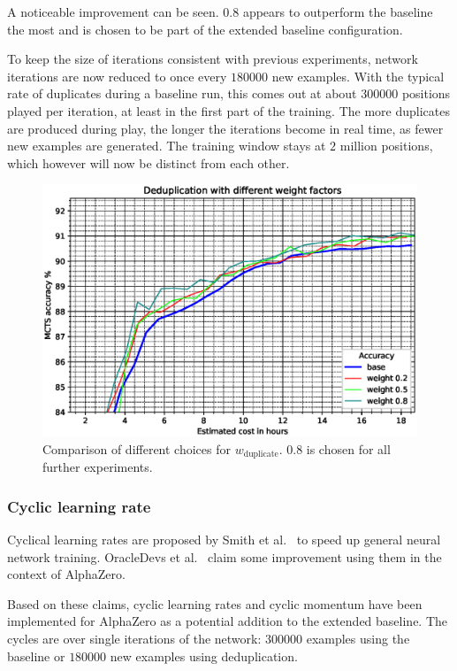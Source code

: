 \documentclass[12pt,onecolumn,oneside,titlepage]{article}
\begin{document}
A noticeable improvement can be seen. $0.8$ appears to outperform the baseline the most and is chosen to be part of the extended baseline configuration.

To keep the size of iterations consistent with previous experiments, network iterations are now reduced to once every $180000$ new examples. With the typical rate of duplicates during a baseline run, this comes out at about $300000$ positions played per iteration, at least in the first part
of the training. The more duplicates are produced during play, the longer the iterations become in real time, as fewer new examples are generated.
The training window stays at $2$ million positions, which however will now be distinct from each other.

\begin{figure}[H]
\centering
\includegraphics[clip,width=\columnwidth]{dedupe}
\caption{Comparison of different choices for $w_{\text{duplicate}}$. $0.8$ is chosen for all further experiments.}
\label{fig:dedupe_cmp}
\end{figure}


\subsubsection{Cyclic learning rate}

Cyclical learning rates are proposed by Smith et al.\ \cite{smith2017cyclical} to speed up general neural network training. OracleDevs et al.\ \cite{oracledevs6} claim some improvement using them in the context of AlphaZero.

Based on these claims, cyclic learning rates and cyclic momentum have been implemented for AlphaZero as a potential addition to the extended baseline. The cycles are over single iterations of the network: $300000$ examples 
using the baseline or $180000$ new examples using deduplication.
\end{document}
